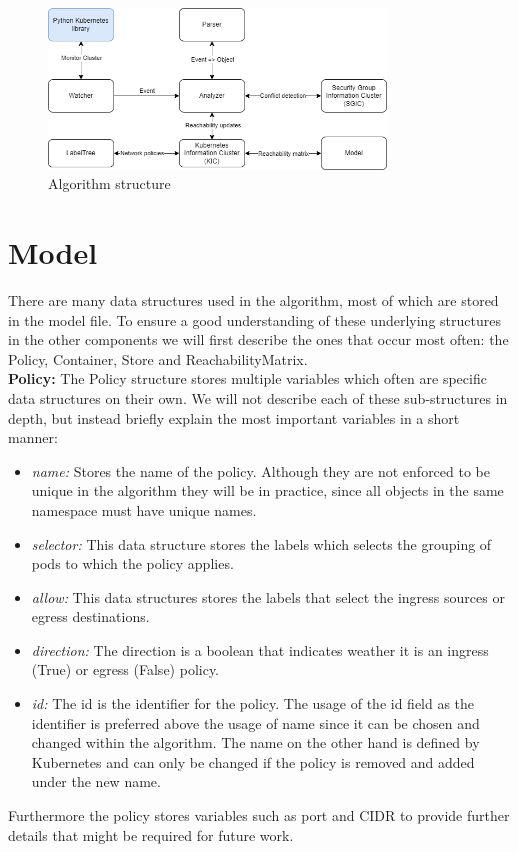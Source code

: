 \begin{figure}[htbp]
  \centering
  \includegraphics[width=0.8\textwidth]{images/algo-components.png}
  \caption{Algorithm structure}
  \label{fig:algorithm}
\end{figure}



\section{Model} \label{impl:model} There are many data structures used in the algorithm, most of which are stored in the model file. To ensure a good understanding of these underlying structures in the other components we will first describe the ones that occur most often: the Policy, Container, Store and ReachabilityMatrix.
\\[10pt]

\textbf{Policy:} The Policy structure stores multiple variables which often are specific data structures on their own. We will not describe each of these sub-structures in depth, but instead briefly explain the most important variables in a short manner:
\begin{itemize}
    \renewcommand{\labelitemi}{\scriptsize$\blacksquare$}
    \item \textit{name:} Stores the name of the policy. Although they are not enforced to be unique in the algorithm they will be in practice, since all objects in the same namespace must have unique names. 
    \item \textit{selector:} This data structure stores the labels which selects the grouping of pods to which the policy applies.
    \item \textit{allow:} This data structures stores the labels that select the ingress sources or egress destinations.
    \item \textit{direction:} The direction is a boolean that indicates weather it is an ingress (True) or egress (False) policy.
    \item \textit{id:} The id is the identifier for the policy. The usage of the id field as the identifier is preferred above the usage of name since it can be chosen and changed within the algorithm. The name on the other hand is defined by Kubernetes and can only be changed if the policy is removed and added under the new name.
\end{itemize}
Furthermore the policy stores variables such as port and CIDR to provide further details that might be required for future work.
\\[10pt]

